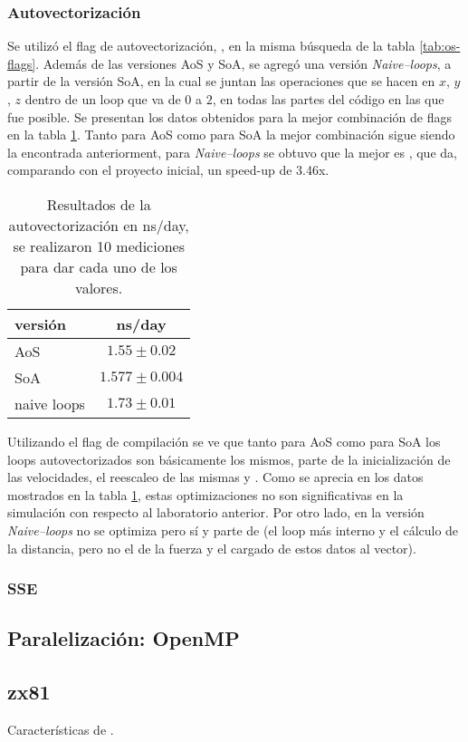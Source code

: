 \documentclass[a4paper,spanish,12pt,twoside]{article}
\begin{document}
\subsubsection*{Autovectorización}

Se utilizó el flag de autovectorización, , en la misma búsqueda de la tabla \ref{tab:os-flags}. Además de las versiones AoS y SoA, se agregó una versión \textit{Naive--loops}, a partir de la versión SoA, en la cual se juntan las operaciones que se hacen en $x$, $y$, $z$ dentro de un loop que va de $0$ a $2$, en todas las partes del código en las que fue posible. Se presentan los datos obtenidos para la mejor combinación de flags en la tabla \ref{tab:autovec}. Tanto para AoS como para SoA la mejor combinación sigue siendo la encontrada anteriorment, para \textit{Naive--loops} se obtuvo que la mejor es , que da, comparando con el proyecto inicial, un speed-up de 3.46x.

\begin{table}[h]
	\centering
	\caption{Resultados de la autovectorización en ns/day, se realizaron 10 mediciones para dar cada uno de los valores.}
	\label{tab:autovec}
	\begin{tabular}{|l|c|}
		\hline
	    versión  	& ns/day           \\
	    \hline
		AoS         & $1.55 \pm 0.02$  \\ 
		SoA         & $1.577 \pm 0.004$  \\
		naive loops & $1.73 \pm 0.01$  \\
		\hline
	\end{tabular}
\end{table}

Utilizando el flag de compilación  se ve que tanto para AoS como para SoA los loops autovectorizados son básicamente los mismos, parte de la inicialización de las velocidades, el reescaleo de las mismas y . Como se aprecia en los datos mostrados en la tabla \ref{tab:autovec}, estas optimizaciones no son significativas en la simulación con respecto al laboratorio anterior. Por otro lado, en la versión \textit{Naive--loops} no se optimiza  pero sí  y parte de  (el loop más interno y el cálculo de la distancia, pero no el de la fuerza y el cargado de estos datos al vector).

\subsubsection*{SSE}

\subsection{Paralelización: OpenMP}

\clearpage
\pagebreak

\begin{appendices}
	\section{zx81}\label{app:zx81}
	Características de .
\end{appendices}
\end{document}
